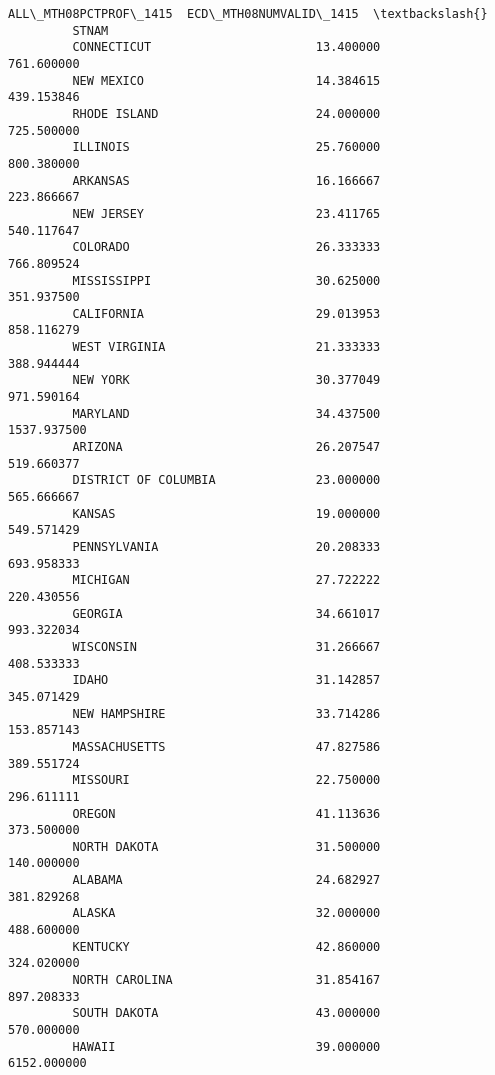 \documentclass[11pt]{article}
\begin{document}
\begin{Verbatim}[commandchars=\\\{\}]
                               ALL\_MTH08PCTPROF\_1415  ECD\_MTH08NUMVALID\_1415  \textbackslash{}
         STNAM                                                                 
         CONNECTICUT                       13.400000              761.600000   
         NEW MEXICO                        14.384615              439.153846   
         RHODE ISLAND                      24.000000              725.500000   
         ILLINOIS                          25.760000              800.380000   
         ARKANSAS                          16.166667              223.866667   
         NEW JERSEY                        23.411765              540.117647   
         COLORADO                          26.333333              766.809524   
         MISSISSIPPI                       30.625000              351.937500   
         CALIFORNIA                        29.013953              858.116279   
         WEST VIRGINIA                     21.333333              388.944444   
         NEW YORK                          30.377049              971.590164   
         MARYLAND                          34.437500             1537.937500   
         ARIZONA                           26.207547              519.660377   
         DISTRICT OF COLUMBIA              23.000000              565.666667   
         KANSAS                            19.000000              549.571429   
         PENNSYLVANIA                      20.208333              693.958333   
         MICHIGAN                          27.722222              220.430556   
         GEORGIA                           34.661017              993.322034   
         WISCONSIN                         31.266667              408.533333   
         IDAHO                             31.142857              345.071429   
         NEW HAMPSHIRE                     33.714286              153.857143   
         MASSACHUSETTS                     47.827586              389.551724   
         MISSOURI                          22.750000              296.611111   
         OREGON                            41.113636              373.500000   
         NORTH DAKOTA                      31.500000              140.000000   
         ALABAMA                           24.682927              381.829268   
         ALASKA                            32.000000              488.600000   
         KENTUCKY                          42.860000              324.020000   
         NORTH CAROLINA                    31.854167              897.208333   
         SOUTH DAKOTA                      43.000000              570.000000   
         HAWAII                            39.000000             6152.000000   

\end{Verbatim}
\end{document}
